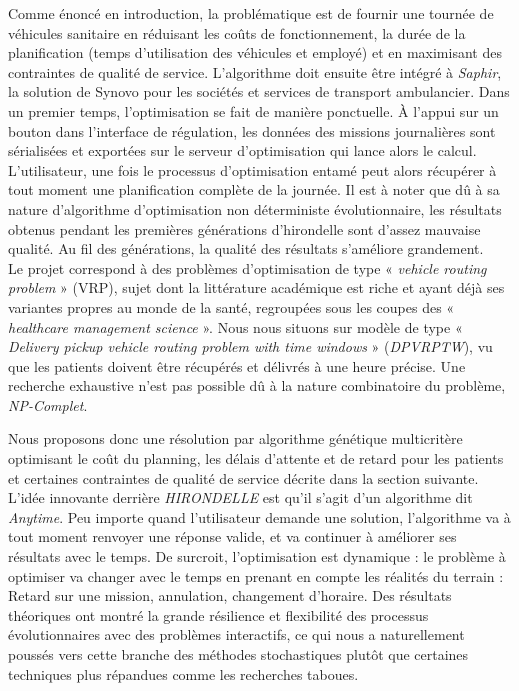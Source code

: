 \documentclass[french, 11pt]{memoir}
\begin{document}
Comme énoncé en introduction, la problématique est de fournir une
tournée de véhicules sanitaire en réduisant les coûts de fonctionnement,
la durée de la planification (temps d'utilisation des véhicules et
employé) et en maximisant des contraintes de qualité de
service. L'algorithme doit ensuite être intégré à \textit{Saphir}, la
solution de Synovo pour les sociétés et services de transport
ambulancier. Dans un premier temps, l'optimisation se fait de manière
ponctuelle. À l'appui sur un bouton dans l'interface de régulation, les
données des missions journalières sont sérialisées et exportées sur le
serveur d'optimisation qui lance alors le calcul.\\
L'utilisateur, une
fois le processus d'optimisation entamé peut alors récupérer à tout
moment une planification complète de la journée. Il est à noter que dû à
sa nature d'algorithme d'optimisation non déterministe évolutionnaire,
les résultats obtenus pendant les premières générations d'hirondelle
sont d'assez mauvaise qualité. Au fil des générations, la qualité des
résultats s'améliore grandement. \\
Le projet correspond à des problèmes
d'optimisation de type « \textit{vehicle routing problem} » (VRP),
sujet dont la littérature académique est riche\cite{kallehauge2005vehicle,toth2001vehicle,kallehauge2005vehicle} et ayant déjà ses
variantes propres au monde de la santé, regroupées sous les coupes des «\textit{
healthcare management science} ». Nous nous situons sur modèle de type «
\textit{Delivery pickup vehicle routing problem with time windows\cite{solomon1987algorithms,kallehauge2005vehicle,ombuki2006multi}} »
(\emph{DPVRPTW}), vu que les patients doivent être récupérés et délivrés
à une heure précise. Une recherche exhaustive n'est pas possible dû à la nature combinatoire
du problème, \textit{NP-Complet\cite{gendreau2008metaheuristics}}.

\bigskip
Nous proposons donc une résolution par algorithme génétique multicritère
optimisant le coût du planning, les délais d'attente et de retard pour
les patients et certaines contraintes de qualité de service décrite dans
la section suivante. \\
L'idée innovante derrière \emph{HIRONDELLE} est
qu'il s'agit d'un algorithme dit \emph{Anytime}. Peu importe quand
l'utilisateur demande une solution, l'algorithme va à tout moment
renvoyer une réponse valide, et va continuer à améliorer ses résultats
avec le temps. De surcroit, l'optimisation est dynamique : le problème à
optimiser va changer avec le temps en prenant en compte les réalités du
terrain : Retard sur une mission, annulation, changement d'horaire. Des
résultats théoriques ont montré la grande résilience et flexibilité des
processus évolutionnaires avec des problèmes interactifs\cite{cho2002towards,hanshar2007dynamic,branke1999evolutionary}, ce qui nous a
naturellement poussés vers cette branche des méthodes stochastiques
plutôt que certaines techniques plus répandues comme les recherches
taboues\cite{gendreau2008metaheuristics}.
\end{document}
